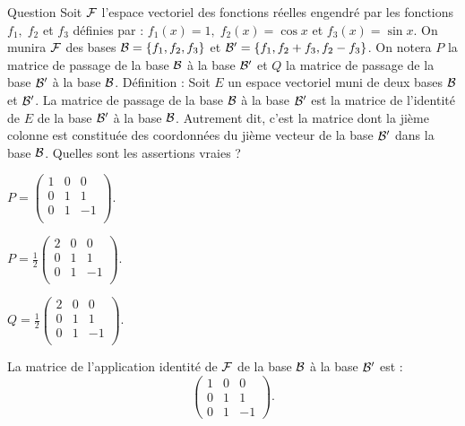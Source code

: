 \begin{multi}[multiple,feedback=
{Par d\'efinition, \(P\) est la matrice de l'application identité de \({{\cal F}}\) de la base \({\cal {B}'}\) à la base \({\cal {B}}\) et \(Q\) est la matrice de l'application identité de \({{\cal F}}\) de la base \({\cal {B}}\) à la base \({\cal {B'}}\). Donc
\[P= \left(\begin{array}{rcc}
1&0&0\\
0&1&1\\ 
0&1&-1\\
\end{array}\right)\quad \mbox{donc}\quad Q= \frac{1}{2}\left(\begin{array}{rcc}
2&0&0\\
0&1&1\\ 
0&1&-1\end{array}\right).\]
}]{Question}
Soit \({\cal F}\) l'espace vectoriel des fonctions réelles engendré par les fonctions \(f_1, \; f_2\) et  \(f_3\) définies par  : 
\(f_1(x)=1, \; f_2(x)=\cos x\) et \(f_3(x)= \sin x\). On munira \({\cal F}\) des bases \({\cal B}=\{f_1,f_2,f_3\}\) et \({\cal B}'=\{f_1,f_2+f_3,f_2-f_3\}\). On notera \(P\) la matrice de passage de la base \(\cal {B}\) à la base \(\cal {B}'\) et \(Q\) la matrice de passage de la base \({\cal {B'}}\) à la base \({\cal {B}}\).
\vskip1mm
Définition : Soit \(E\) un espace vectoriel muni de deux bases \({\cal {B}}\) et \({\cal {B}}'\). La matrice de passage de la base \({\cal {B}}\) à la base  \({\cal {B}}'\) est la matrice de l'identité de \(E\) de la base \({\cal {B}}'\) à la base  \({\cal {B}}\). Autrement dit, c'est la matrice dont la jième colonne est constituée des coordonnées du jième vecteur de la base \({\cal {B}'}\) dans la base  \({\cal {B}}\).
\vskip1mm
Quelles sont les assertions vraies ?

    \item* \(
P =\left(\begin{array}{rcc}
1&0&0\\
0&1&1\\
0&1&-1\\
\end{array}\right).\)
    \item \(
P = \frac{1}{2}\left(\begin{array}{rcc}
2&0&0\\
0&1&1\\
0&1&-1\\
\end{array}\right).\)
    \item* \(Q= \frac{1}{2}\left(\begin{array}{rcc}
2&0&0\\
0&1&1\\
0&1&-1\\
\end{array}\right).\)
    \item La matrice de l'application identité de \({{\cal F}}\) de la base \({\cal {B}}\) à la base \({\cal {B'}}\) est :
\[\left(\begin{array}{rcc}
1&0&0\\
0&1&1\\
0&1&-1\end{array}\right).\]
\end{multi}


